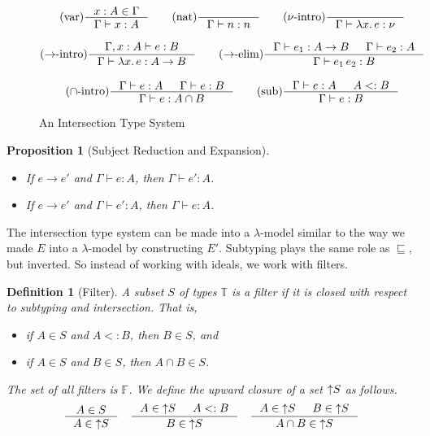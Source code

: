 \documentclass{tufte-handout}
\newcommand{\LAM}[1]{\lambda #1.\,}
\newcommand{\APP}[0]{\,}
\newtheorem{proposition}[theorem]{Proposition}
\newtheorem{definition}{Definition}%
\begin{document}
\begin{figure}
\begin{gather*}
\text{(var)}
\inference{x:A \in \Gamma}
          {\Gamma \vdash x : A}
\qquad
\text{(nat)}
\inference{}{\Gamma \vdash n : n}
\qquad
\text{($\nu$-intro)}
\inference{}
          {\Gamma \vdash \LAM{x} e : \nu}
\\[2ex]
\text{($\to$-intro)}
\inference{\Gamma,x:A \vdash e : B}
          {\Gamma \vdash \LAM{x} e : A \to B}
\qquad
\text{($\to$-elim)}
\inference{\Gamma \vdash e_1 : A \to B & \Gamma \vdash e_2 : A}
          {\Gamma \vdash e_1 \APP e_2 : B}
\\[2ex]
\text{($\cap$-intro)}
\inference{\Gamma \vdash e : A & \Gamma \vdash e : B}
          {\Gamma \vdash e : A \cap B}
\qquad
\text{(sub)}
\inference{\Gamma \vdash e : A & A <: B}
          {\Gamma \vdash e : B}
\end{gather*}

\caption{An Intersection Type System}
\label{fig:intersect-type-system}
\end{figure}


\begin{proposition}[Subject Reduction and Expansion]\ 
  \begin{itemize}
  \item If $e \longrightarrow e'$ and $\Gamma \vdash e : A$,
    then $\Gamma \vdash e' : A$.
  \item If $e \longrightarrow e'$ and $\Gamma \vdash e' : A$,
    then $\Gamma \vdash e : A$.
  \end{itemize}
\end{proposition}


The intersection type system can be made into a $\lambda$-model
similar to the way we made $E$ into a $\lambda$-model by constructing
$E'$. Subtyping plays the same role as $\sqsubseteq$, but inverted.
So instead of working with ideals, we work with filters.

\begin{definition}[Filter]
  A subset $S$ of types $\mathbb{T}$ is a \emph{filter} if it is
  closed with respect to subtyping and intersection. That is,
  \begin{itemize}
  \item if $A \in S$ and $A <: B$, then $B \in S$, and
  \item if $A \in S$ and $B \in S$, then $A \cap B \in S$.
  \end{itemize}
  The set of all filters is $\mathbb{F}$.
  We define the upward closure of a set $\mathop{\uparrow}\! S$ as follows.
  \begin{gather*}
    \inference{A \in S}
              {A \in \UP{S}} 
    \quad
    \inference{A \in \UP{S} & A <: B}
              {B \in \UP{S}}
    \quad
    \inference{A \in \UP{S} & B \in \UP{S}}
              {A \cap B \in \UP{S}}
  \end{gather*}
\end{definition}
\end{document}
